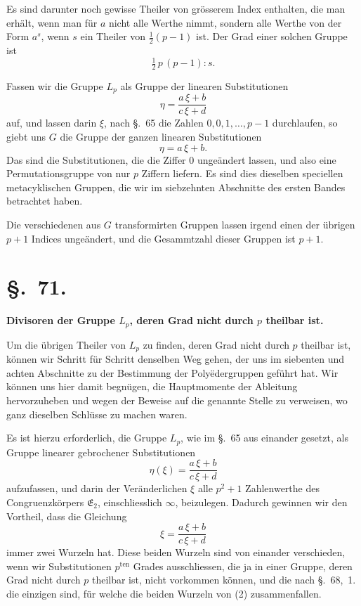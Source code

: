 \documentclass[12pt,a4paper]{article}
\newcommand{\sect}[1]{\section*{{\S.~#1.}}\addcontentsline{toc}{section}{\S.~#1}}
\begin{document}
Es sind darunter noch gewisse Theiler von grösserem Index enthalten, die man erhält, wenn man für $a$ nicht alle Werthe nimmt, sondern alle Werthe von der Form $a^{s}$, wenn $s$ ein Theiler von $\frac{1}{2}(p-1)$ ist. Der Grad einer solchen Gruppe ist
\[
\tfrac{1}{2}\,p\,(p-1) : s.
\]

Fassen wir die Gruppe $L_{p}$ als Gruppe der linearen Substitutionen
\[
\eta = \frac{a\,\xi + b}{c\,\xi + d}
\]
auf, und lassen darin $\xi$, nach \S.~65 die Zahlen $0, 0, 1, \ldots, p-1$ durchlaufen, so giebt uns $G$ die Gruppe der ganzen linearen Substitutionen
\[
\eta = a\,\xi + b.
\]
Das sind die Substitutionen, die die Ziffer $0$ ungeändert lassen, und also eine Permutationsgruppe von nur $p$ Ziffern liefern. Es sind dies dieselben speciellen metacyklischen Gruppen, die wir im siebzehnten Abschnitte des ersten Bandes betrachtet haben.

Die verschiedenen aus $G$ transformirten Gruppen lassen irgend einen der übrigen $p+1$ Indices ungeändert, und die Gesammtzahl dieser Gruppen ist $p + 1$.

\newpage
\sect{71}
\begin{center}
\textbf{Divisoren der Gruppe $L_{p}$, deren Grad nicht durch $p$ theilbar ist.}
\end{center}
\label{sec:71}

Um die übrigen Theiler von $L_{p}$ zu finden, deren Grad nicht durch $p$ theilbar ist, können wir Schritt für Schritt denselben Weg gehen, der uns im siebenten und achten Abschnitte zu der Bestimmung der Polyëdergruppen geführt hat. Wir können uns hier damit begnügen, die Hauptmomente der Ableitung hervorzuheben und wegen der Beweise auf die genannte Stelle zu verweisen, wo ganz dieselben Schlüsse zu machen waren.

Es ist hierzu erforderlich, die Gruppe $L_{p}$, wie im \S.~65 aus einander gesetzt, als Gruppe linearer gebrochener Substitutionen
\begin{equation}\label{eq:71.1}
\tag{1}
\eta(\xi) = \frac{a\,\xi + b}{c\,\xi + d}
\end{equation}
aufzufassen, und darin der Veränderlichen $\xi$ alle $p^{2} + 1$ Zahlenwerthe des Congruenzkörpers $\mathfrak{E}_{2}$, einschliesslich $\infty$, beizulegen. Dadurch gewinnen wir den Vortheil, dass die Gleichung
\begin{equation}\label{eq:71.2}
\tag{2}
\xi = \frac{a\,\xi + b}{c\,\xi + d}
\end{equation}
immer zwei Wurzeln hat. Diese beiden Wurzeln sind von einander verschieden, wenn wir Substitutionen $p^{\text{ten}}$ Grades ausschliessen, die ja in einer Gruppe, deren Grad nicht durch $p$ theilbar ist, nicht vorkommen können, und die nach \S.~68,~1. die einzigen sind, für welche die beiden Wurzeln von (2) zusammenfallen.
\end{document}
